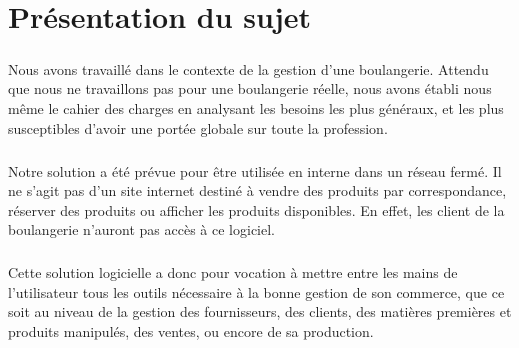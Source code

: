 \chapter{Présentation du sujet}

\paragraph{}
    Nous avons travaillé dans le contexte de la gestion d'une boulangerie.
    Attendu que nous ne travaillons pas pour une boulangerie réelle, nous avons
    établi nous même le cahier des charges en analysant les besoins les plus
    généraux, et les plus susceptibles d'avoir une portée globale sur toute
    la profession.
\paragraph{}
    Notre solution a été prévue pour être utilisée en interne dans un réseau
    fermé. Il ne s'agit pas d'un site internet destiné à vendre des
    produits par correspondance, réserver des produits ou afficher les produits
    disponibles. En effet, les client de la boulangerie n'auront pas accès à ce
    logiciel.
\paragraph{}
    Cette solution logicielle a donc pour vocation à mettre entre les mains de 
    l'utilisateur tous les outils nécessaire à la bonne gestion de son
    commerce, que ce soit au niveau de la gestion des fournisseurs, des
    clients, des matières premières et produits manipulés, des ventes,
    ou encore de sa production.